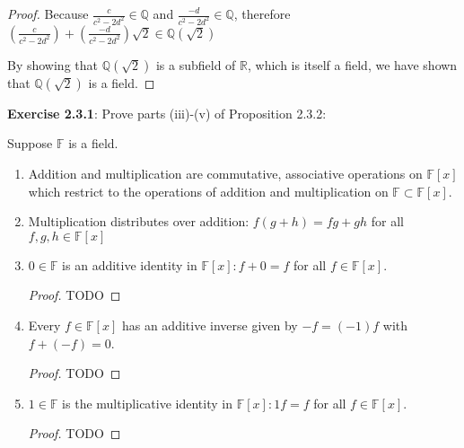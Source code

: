 \documentclass[a4paper]{article}
\begin{document}
\begin{myparindent}{0pt}
\begin{proof}
    Because $\frac{c}{c^2 - 2d^2} \in \mathbb{Q}$ and $\frac{-d}{c^2 - 2d^2} \in \mathbb{Q}$,
    therefore
    $(\frac{c}{c^2 - 2 d^2}) + (\frac{-d}{c^2 - 2d^2}) \sqrt{2} \in \mathbb{Q}(\sqrt{2})$ \newline

    By showing that $\mathbb{Q}(\sqrt{2})$ is a subfield of $\mathbb{R}$,
    which is itself a field, we have shown that $\mathbb{Q}(\sqrt{2})$ is a
    field.

\end{proof}

\textbf{Exercise 2.3.1}:
Prove parts (iii)-(v) of Proposition 2.3.2:

Suppose $\mathbb{F}$ is a field.

\begin{enumerate}[label=(\roman*)]
  \item Addition and multiplication are commutative, associative operations on
  $\mathbb{F}[x]$ which restrict to the operations of addition and multiplication
  on $\mathbb{F} \subset \mathbb{F}[x]$.

  \item Multiplication distributes over addition: $f(g + h) = fg + gh$ for all
  $f, g, h \in \mathbb{F}[x]$

  \item $0 \in \mathbb{F}$ is an additive identity in $\mathbb{F}[x]: f + 0 = f$
  for all $f \in \mathbb{F}[x]$.
    \begin{proof}
    TODO
    \end{proof}

  \item Every $f \in \mathbb{F}[x]$ has an additive inverse given by
  $-f = (-1)f$ with $f + (-f) = 0$.
    \begin{proof}
    TODO
    \end{proof}

  \item $1 \in \mathbb{F}$ is the multiplicative identity in
  $\mathbb{F}[x]: 1f = f$ for all $f \in \mathbb{F}[x]$.
    \begin{proof}
    TODO
    \end{proof}
\end{enumerate}

\end{myparindent}
\end{document}
